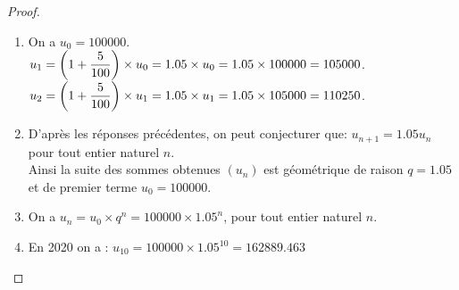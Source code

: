   \begin{proof}
   
   \begin{enumerate}
   \item   On a $ u_0=100 000 $.\\
   $ u_{1} =\left(1+\dfrac{5}{100}\right)\times u_0=1.05 \times u_0= 1.05\times 100  000=105 000$.\\
    $ u_{2} =\left(1+\dfrac{5}{100}\right)\times u_1=1.05 \times u_1= 1.05\times 105  000=110  250$.
   \item D'après les réponses précédentes, on peut conjecturer que:\; $ u_{n+1}=1.05 u_n $ pour tout entier  naturel  $ n $.\\
   Ainsi la suite des sommes obtenues $( u_n )$  est géométrique de raison $ q=1.05 $  et de premier terme $ u_0=100 000 $.
   \item On a \; $ u_n= u_{0}\times q^{n} =100 000\times 1.05^{n}$, pour tout entier naturel $ n $.
   \item En 2020 on a : $ u_{10}=100 000\times1.05^{10}=162 889.463 $
   \end{enumerate}
\end{proof}


